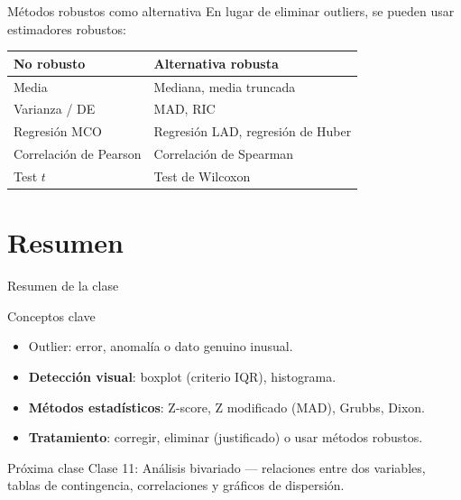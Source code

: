 \documentclass[aspectratio=169]{beamer}
\begin{document}
\begin{frame}{Métodos robustos como alternativa}
  En lugar de eliminar outliers, se pueden usar estimadores robustos:
  \bigskip
  \begin{center}
    \begin{tabular}{ll}
      \toprule
      \textbf{No robusto} & \textbf{Alternativa robusta} \\
      \midrule
      Media & Mediana, media truncada \\
      Varianza / DE & MAD, RIC \\
      Regresión MCO & Regresión LAD, regresión de Huber \\
      Correlación de Pearson & Correlación de Spearman \\
      Test $t$ & Test de Wilcoxon \\
      \bottomrule
    \end{tabular}
  \end{center}
\end{frame}

\section{Resumen}

\begin{frame}{Resumen de la clase}
  \begin{block}{Conceptos clave}
    \begin{itemize}
      \item Outlier: error, anomalía o dato genuino inusual.
      \item \textbf{Detección visual}: boxplot (criterio IQR), histograma.
      \item \textbf{Métodos estadísticos}: Z-score, Z modificado (MAD), Grubbs, Dixon.
      \item \textbf{Tratamiento}: corregir, eliminar (justificado) o usar métodos robustos.
    \end{itemize}
  \end{block}
  \bigskip
  \begin{block}{Próxima clase}
    Clase 11: Análisis bivariado — relaciones entre dos variables, tablas de contingencia, correlaciones y gráficos de dispersión.
  \end{block}
\end{frame}
\end{document}
